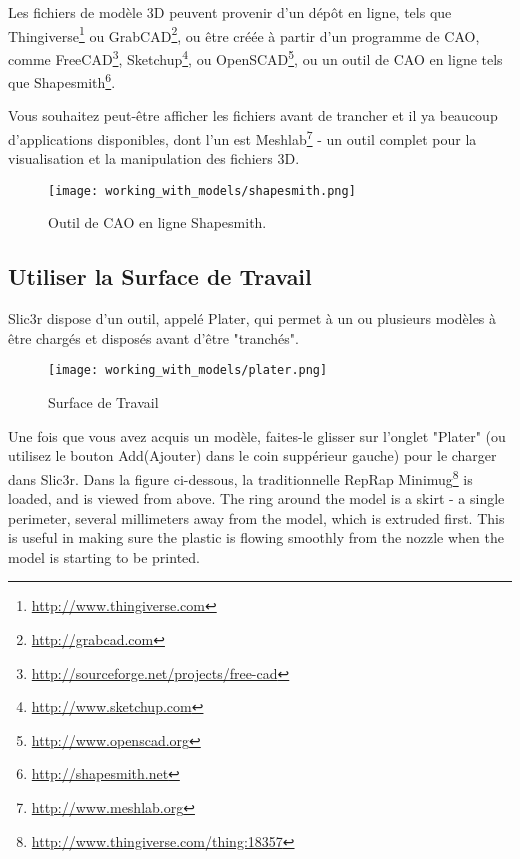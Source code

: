 Les fichiers de mod\`ele 3D peuvent provenir d'un d\'ep\^ot en ligne, tels que Thingiverse\footnote{\url{http://www.thingiverse.com}} ou GrabCAD\footnote{\url{http://grabcad.com}}, ou \^etre cr\'e\'ee \`a partir d'un programme de CAO, comme FreeCAD\footnote{\url{http://sourceforge.net/projects/free-cad}}, Sketchup\footnote{\url{http://www.sketchup.com}}, ou OpenSCAD\footnote{\url{http://www.openscad.org}}, ou un outil de CAO en ligne tels que Shapesmith\footnote{\url{http://shapesmith.net}}.

Vous souhaitez peut-\^etre afficher les fichiers avant de trancher et il ya beaucoup d'applications disponibles, dont l'un est Meshlab\footnote{\url{http://www.meshlab.org}} - un outil complet pour la visualisation et la manipulation des fichiers 3D.

\begin{figure}[H]
\centering
\texttt{[image: working\_with\_models/shapesmith.png]}
\caption{Outil de CAO en ligne Shapesmith.}
\label{fig:shapesmith}
\end{figure}



\subsection{Utiliser la Surface de Travail} %
\label{sub:working_with_plater}
Slic3r dispose d'un outil, appel\'e Plater, qui permet \`a un ou plusieurs mod\`eles \`a \^etre charg\'es et dispos\'es avant d'\^etre "tranch\'es".

\begin{figure}[H]
\centering
\texttt{[image: working\_with\_models/plater.png]}
\caption{Surface de Travail}
\label{fig:plater}
\end{figure}


Une fois que vous avez acquis un mod\`ele, faites-le glisser sur l'onglet "Plater" (ou utilisez le bouton Add(Ajouter) dans le coin supp\'erieur gauche) pour le charger dans Slic3r. Dans la figure ci-dessous, la traditionnelle RepRap Minimug\footnote{\url{http://www.thingiverse.com/thing:18357}} is loaded, and is viewed from above. The ring around the model is a skirt - a single perimeter, several millimeters away from the model, which is extruded first.  This is useful in making sure the plastic is flowing smoothly from the nozzle when the model is starting to be printed.

